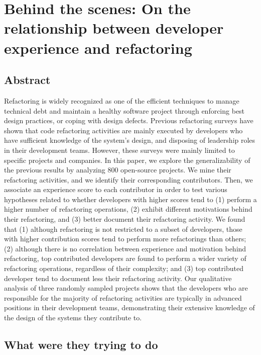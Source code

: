 
\section{Behind the scenes: On the relationship between developer experience and refactoring}

\subsection{Abstract}

Refactoring is widely recognized as one of the efficient techniques to manage technical debt and maintain a healthy software project through enforcing best design practices, or coping with design defects. Previous refactoring surveys have shown that code refactoring activities are mainly executed by developers who have sufficient knowledge of the system's design, and disposing of leadership roles in their development teams. However, these surveys were mainly limited to specific projects and companies. In this paper, we explore the generalizability of the previous results by analyzing 800 open-source projects. We mine their refactoring activities, and we identify their corresponding contributors. Then, we associate an experience score to each contributor in order to test various hypotheses related to whether developers with higher scores tend to (1) perform a higher number of refactoring operations, (2) exhibit different motivations behind their refactoring, and (3) better document their refactoring activity. We found that (1) although refactoring is not restricted to a subset of developers, those with higher contribution scores tend to perform more refactorings than others; (2) although there is no correlation between experience and motivation behind refactoring, top contributed developers are found to perform a wider variety of refactoring operations, regardless of their complexity; and (3) top contributed developer tend to document less their refactoring activity. Our qualitative analysis of three randomly sampled projects shows that the developers who are responsible for the majority of refactoring activities are typically in advanced positions in their development teams, demonstrating their extensive knowledge of the design of the systems they contribute to.

\subsection{What were they trying to do}


